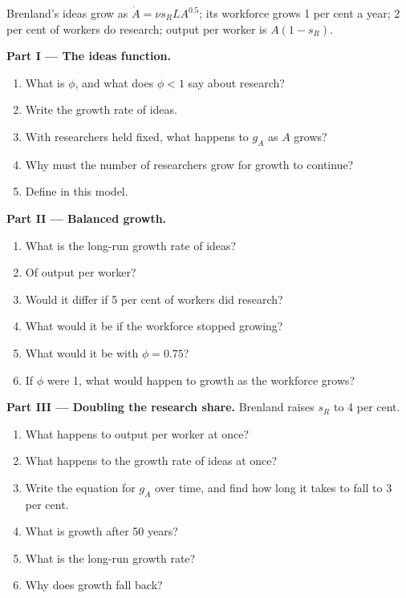 \begin{problem}
\label{pb:b2:endogenous-growth:1}
Brenland's ideas grow as $\dot A = \nu s_RLA^{0.5}$; its workforce grows 1 per cent a year; 2 per cent of workers do research; output per worker is $A(1 - s_R)$.

\medskip
\noindent\textbf{Part I --- The ideas function.}
\begin{enumerate}
  \item What is $\phi$, and what does $\phi < 1$ say about research?
  \item Write the growth rate of ideas.
  \item With researchers held fixed, what happens to $g_A$ as $A$ grows?
  \item Why must the number of researchers grow for growth to continue?
  \item Define  in this model.
\end{enumerate}

\medskip
\noindent\textbf{Part II --- Balanced growth.}
\begin{enumerate}[resume]
  \item What is the long-run growth rate of ideas?
  \item Of output per worker?
  \item Would it differ if 5 per cent of workers did research?
  \item What would it be if the workforce stopped growing?
  \item What would it be with $\phi = 0.75$?
  \item If $\phi$ were 1, what would happen to growth as the workforce grows?
\end{enumerate}

\medskip
\noindent\textbf{Part III --- Doubling the research share.} Brenland raises $s_R$ to 4 per cent.
\begin{enumerate}[resume]
  \item What happens to output per worker at once?
  \item What happens to the growth rate of ideas at once?
  \item Write the equation for $g_A$ over time, and find how long it takes to fall to 3 per cent.
  \item What is growth after 50 years?
  \item What is the long-run growth rate?
  \item Why does growth fall back?
\end{enumerate}


\end{problem}
